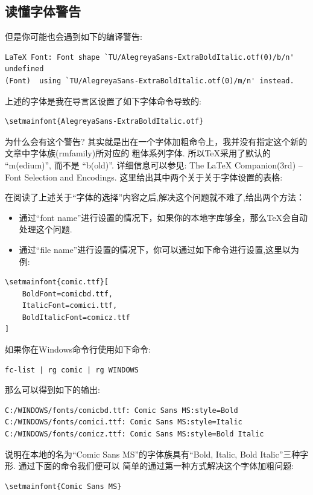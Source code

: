 \subsection{读懂字体警告}
但是你可能也会遇到如下的编译警告:
\begin{verbatim}
LaTeX Font: Font shape `TU/AlegreyaSans-ExtraBoldItalic.otf(0)/b/n' undefined
(Font)	using `TU/AlegreyaSans-ExtraBoldItalic.otf(0)/m/n' instead.
\end{verbatim}

上述的字体是我在导言区设置了如下字体命令导致的:
\begin{verbatim}
\setmainfont{AlegreyaSans-ExtraBoldItalic.otf}
\end{verbatim}

为什么会有这个警告? 其实就是出在一个字体加粗命令\cmd{\textbf}上，我并没有指定这个新的文章中字体族(rmfamily)所对应的
粗体系列字体. 所以\TeX{}采用了默认的 ``m(edium)'', 而不是 ``b(old)''. 详细信息可以参见\cite{goossens1994latex}:
The \LaTeX{} Companion(3rd) -- Font Selection and Encodings. 这里给出其中两个关于关于字体设置的表格:





在阅读了上述关于``字体的选择''内容之后,解决这个问题就不难了,给出两个方法：
\begin{itemize}
    \item 通过``font name''进行设置的情况下，如果你的本地字库够全，那么\TeX{}会自动处理这个问题.
    \item 通过``file name''进行设置的情况下，你可以通过如下命令进行设置,这里以为例:
\end{itemize}

\begin{verbatim}
\setmainfont{comic.ttf}[
    BoldFont=comicbd.ttf,
    ItalicFont=comici.ttf,
    BoldItalicFont=comicz.ttf
]
\end{verbatim}

如果你在Windows命令行使用如下命令:
\begin{verbatim}
fc-list | rg comic | rg WINDOWS
\end{verbatim}

那么可以得到如下的输出:
\begin{verbatim}
C:/WINDOWS/fonts/comicbd.ttf: Comic Sans MS:style=Bold
C:/WINDOWS/fonts/comici.ttf: Comic Sans MS:style=Italic
C:/WINDOWS/fonts/comicz.ttf: Comic Sans MS:style=Bold Italic
\end{verbatim}

说明在本地的名为``Comic Sans MS''的字体族具有``Bold, Italic, Bold Italic''三种字形. 通过下面的命令我们便可以
简单的通过第一种方式解决这个字体加粗问题:
\begin{verbatim}
\setmainfont{Comic Sans MS}
\end{verbatim}


